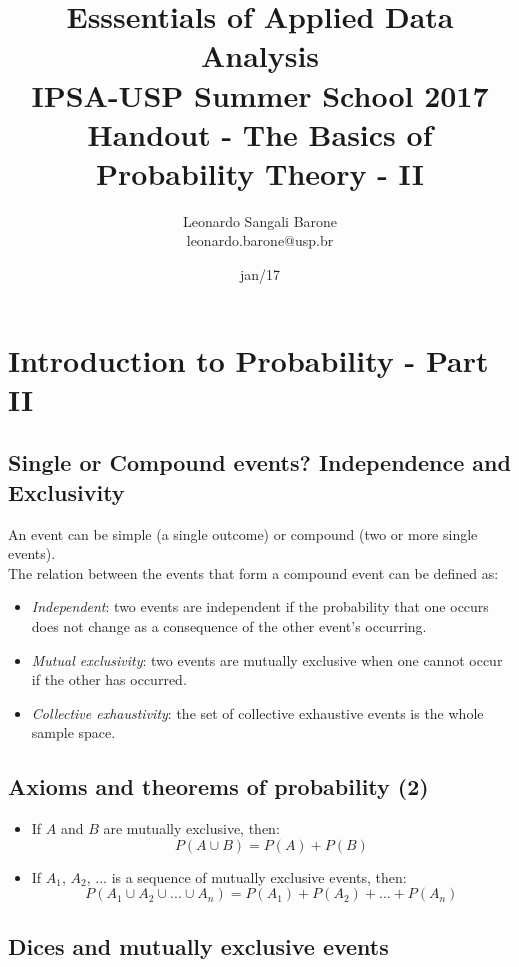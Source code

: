 \documentclass[11pt]{article}
\title{\textbf{Esssentials of Applied Data Analysis\\
				IPSA-USP Summer School 2017}\newline\\
				Handout - The Basics of Probability Theory - II}
\author{Leonardo Sangali Barone\\leonardo.barone@usp.br}
\date{jan/17}
\begin{document}
\maketitle

\section*{Introduction to Probability - Part II}

	\subsection*{Single or Compound events? Independence and Exclusivity}

	An event can be simple (a single outcome) or compound (two or more single events).\\

	The relation between the events that form a compound event can be defined as:
	
	\begin{itemize}
		\item \emph{Independent}: two events are independent if the probability that one occurs does not change as a consequence of the other event’s occurring.
		\item \emph{Mutual exclusivity}: two events are mutually exclusive when one cannot occur if the  other has occurred.
		\item \emph{Collective exhaustivity}: the set of collective exhaustive events is the whole sample space.
	\end {itemize}


	\subsection*{Axioms and theorems of probability (2)}
	\begin{itemize}
		\item  If $A$ and $B$ are mutually exclusive, then:
	\[P(A \cup B) = P(A) + P (B)\]
		\item  If $A_1$, $A_2$, ... is a sequence of mutually exclusive events, then:
	\[P(A_1 \cup A_2 \cup ... \cup A_n) = P(A_1) + P (A_2) + ... + P(A_n)\]
	\end{itemize}


	\subsection*{Dices and mutually exclusive events}
\end{document}
